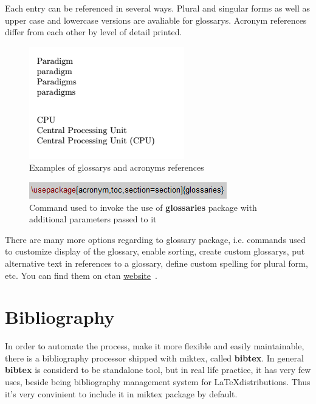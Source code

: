 Each entry can be referenced in several ways. Plural and singular forms as well as upper case and lowercase versions are avaliable for \glspl{glossary}. Acronym references differ from each other by level of detail printed.

\begin{figure}[H]
\centering
\includegraphics[scale=1.0]{content/LaTeX/figures/glossary_calls.png}
\caption{Examples of \glspl{glossary} and acronyms references}
\end{figure}

\begin{figure}[H]
\centering
\includegraphics[scale=1.0]{content/LaTeX/figures/usepackage_glossaries.png}
\caption{Command used to invoke the use of \textbf{glossaries} package with additional parameters passed to it}
\label{fig:usepackage_glossaries}
\end{figure}

There are many more options regarding to \gls{glossary} package, i.e. commands used to customize display of the \gls{glossary}, enable sorting, create custom \glspl{glossary}, put alternative text in references to a \gls{glossary}, define custom spelling for plural form, etc. You can find them on \acrshort{ctan} \href{https://www.ctan.org/pkg/glossaries}{website}~\cite{ctan_glossaries}.

\section{Bibliography}

In order to automate the process, make it more flexible and easily maintainable, there is a bibliography processor shipped with \Gls{miktex}, called \textbf{\Gls{bibtex}}. In general \textbf{\Gls{bibtex}} is considerd to be standalone tool, but in real life practice, it has very few uses, beside being bibliography management system for \LaTeX distributions. Thus it's very convinient to include it in \Gls{miktex} package by default.

